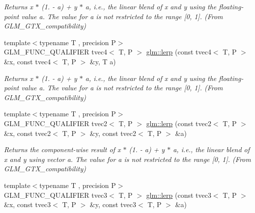 \begin{DoxyCompactItemize}
\begin{DoxyCompactList}\small\item\em Returns x $\ast$ (1. -\/ a) + y $\ast$ a, i.\-e., the linear blend of x and y using the floating-\/point value a. The value for a is not restricted to the range \mbox{[}0, 1\mbox{]}. (From G\-L\-M\-\_\-\-G\-T\-X\-\_\-compatibility) \end{DoxyCompactList}\item 
\hypertarget{group__gtx__compatibility_ga363d5d069d31a6c2cdd1e9589dde4a60}{{\footnotesize template$<$typename T , precision P$>$ }\\G\-L\-M\-\_\-\-F\-U\-N\-C\-\_\-\-Q\-U\-A\-L\-I\-F\-I\-E\-R tvec4$<$ T, P $>$ \hyperlink{group__gtx__compatibility_ga363d5d069d31a6c2cdd1e9589dde4a60}{glm\-::lerp} (const tvec4$<$ T, P $>$ \&x, const tvec4$<$ T, P $>$ \&y, T a)}\label{group__gtx__compatibility_ga363d5d069d31a6c2cdd1e9589dde4a60}

\begin{DoxyCompactList}\small\item\em Returns x $\ast$ (1. -\/ a) + y $\ast$ a, i.\-e., the linear blend of x and y using the floating-\/point value a. The value for a is not restricted to the range \mbox{[}0, 1\mbox{]}. (From G\-L\-M\-\_\-\-G\-T\-X\-\_\-compatibility) \end{DoxyCompactList}\item 
\hypertarget{group__gtx__compatibility_ga7609b44d8aefc5a277efe73395ff4070}{{\footnotesize template$<$typename T , precision P$>$ }\\G\-L\-M\-\_\-\-F\-U\-N\-C\-\_\-\-Q\-U\-A\-L\-I\-F\-I\-E\-R tvec2$<$ T, P $>$ \hyperlink{group__gtx__compatibility_ga7609b44d8aefc5a277efe73395ff4070}{glm\-::lerp} (const tvec2$<$ T, P $>$ \&x, const tvec2$<$ T, P $>$ \&y, const tvec2$<$ T, P $>$ \&a)}\label{group__gtx__compatibility_ga7609b44d8aefc5a277efe73395ff4070}

\begin{DoxyCompactList}\small\item\em Returns the component-\/wise result of x $\ast$ (1. -\/ a) + y $\ast$ a, i.\-e., the linear blend of x and y using vector a. The value for a is not restricted to the range \mbox{[}0, 1\mbox{]}. (From G\-L\-M\-\_\-\-G\-T\-X\-\_\-compatibility) \end{DoxyCompactList}\item 
\hypertarget{group__gtx__compatibility_ga90a1d1364a8d078846857178bdcc9af1}{{\footnotesize template$<$typename T , precision P$>$ }\\G\-L\-M\-\_\-\-F\-U\-N\-C\-\_\-\-Q\-U\-A\-L\-I\-F\-I\-E\-R tvec3$<$ T, P $>$ \hyperlink{group__gtx__compatibility_ga90a1d1364a8d078846857178bdcc9af1}{glm\-::lerp} (const tvec3$<$ T, P $>$ \&x, const tvec3$<$ T, P $>$ \&y, const tvec3$<$ T, P $>$ \&a)}\label{group__gtx__compatibility_ga90a1d1364a8d078846857178bdcc9af1}


\end{DoxyCompactItemize}

